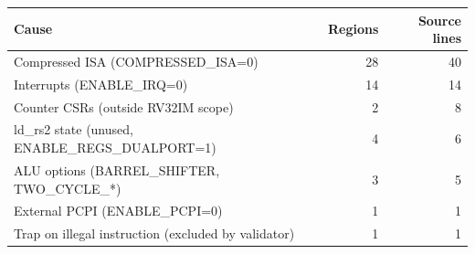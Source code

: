 \begin{tabular}{@{}l r r@{}}\toprule
Cause & Regions & Source lines\\\midrule
Compressed ISA (COMPRESSED\_ISA=0) & 28 & 40\\
Interrupts (ENABLE\_IRQ=0) & 14 & 14\\
Counter CSRs (outside RV32IM scope) & 2 & 8\\
ld\_rs2 state (unused, ENABLE\_REGS\_DUALPORT=1) & 4 & 6\\
ALU options (BARREL\_SHIFTER, TWO\_CYCLE\_*) & 3 & 5\\
External PCPI (ENABLE\_PCPI=0) & 1 & 1\\
Trap on illegal instruction (excluded by validator) & 1 & 1\\
\bottomrule\end{tabular}